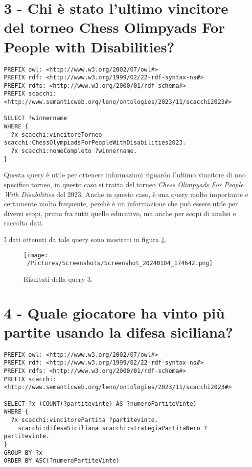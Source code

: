\documentclass[12pt]{book}
\begin{document}
\section{3 - Chi è stato l'ultimo vincitore del torneo Chess Olimpyads For
People with Disabilities?}

\begin{verbatim}
PREFIX owl: <http://www.w3.org/2002/07/owl#>
PREFIX rdf: <http://www.w3.org/1999/02/22-rdf-syntax-ns#>
PREFIX rdfs: <http://www.w3.org/2000/01/rdf-schema#>
PREFIX scacchi: <http://www.semanticweb.org/leno/ontologies/2023/11/scacchi2023#>

SELECT ?winnername
WHERE {
  ?x scacchi:vincitoreTorneo scacchi:ChessOlympiadsForPeopleWithDisabilities2023.
  ?x scacchi:nomeCompleto ?winnername.
}
\end{verbatim}

Questa query è utile per ottenere informazioni riguardo l'ultimo
vincitore di uno specifico torneo, in questo caso si tratta del torneo
\textit{Chess Olimpyads For People With Disabilities} del 2023. Anche
in questo caso, è una query molto importante e certamente molto
frequente, perchè è un informazione che può essere utile per diversi
scopi, primo fra tutti quello educativo, ma anche per scopi di analisi
e raccolta dati.

I dati ottenuti da tale query sono mostrati in figura \ref{fig:query3}.

\begin{figure}[h]
  \caption{Risultati della query 3.}
  \centering
  \label{fig:query3}
  \texttt{[image: ~/Pictures/Screenshots/Screenshot\_20240104\_174642.png]}
\end{figure} 

\section{4 - Quale giocatore ha vinto più partite usando la difesa siciliana?}

\begin{verbatim}
PREFIX owl: <http://www.w3.org/2002/07/owl#>
PREFIX rdf: <http://www.w3.org/1999/02/22-rdf-syntax-ns#>
PREFIX rdfs: <http://www.w3.org/2000/01/rdf-schema#>
PREFIX scacchi: <http://www.semanticweb.org/leno/ontologies/2023/11/scacchi2023#>

SELECT ?x (COUNT(?partitevinte) AS ?numeroPartiteVinte)
WHERE {
  ?x scacchi:vincitorePartita ?partitevinte.
    scacchi:difesaSiciliana scacchi:strategiaPartitaNero ?partitevinte.
}
GROUP BY ?x
ORDER BY ASC(?numeroPartiteVinte)
\end{verbatim}
\end{document}
